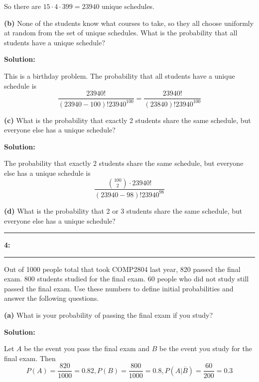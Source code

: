 \documentclass[11pt]{article}
\newcommand\question[2]{\vspace{.25in}\hrule\textbf{#1: #2}\vspace{.5em}\hrule\vspace{.10in}}
\renewcommand\part[1]{\vspace{.10in}\textbf{(#1)}}
\newcommand{\solution}{\vspace{.10in}\textbf{Solution: }}
\begin{document}
So there are $15\cdot 4 \cdot 399 = 23940$ unique schedules.

\part{b} None of the students know what courses to take, so they all choose uniformly at random from the set of unique schedules. What is the probability that all students have a unique schedule?

\solution

This is a birthday problem. The probability that all students have a unique schedule is
\[
\frac{23940!}{(23940-100)! 23940^{100}} = \frac{23940!}{(23840)! 23940^{100}}
\]

\part{c}
What is the probability that exactly 2 students share the same schedule, but everyone else has a unique schedule?

\solution

The probability that exactly 2 students share the same schedule, but everyone else has a unique schedule is
\[
\frac{\binom{100}{2} \cdot 23940!}{(23940-98)! 23940^{98}}
\]

\part{d}
What is the probability that 2 or 3 students share the same schedule, but everyone else has a unique schedule?

\question{4}{}
Out of 1000 people total that took COMP2804 last year, 820 passed the final exam. 800 students studied for the final exam. 60 people who did not study still passed the final exam. Use these numbers to define initial probabilities and answer the following questions.

\part{a} What is your probability of passing the final exam if you study?

\solution

Let $A$ be the event you pass the final exam and $B$ be the event you study for the final exam. Then
\begin{equation*}
  P(A) = \frac{820}{1000} = 0.82, P(B) = \frac{800}{1000} = 0.8, P(A|\overline{B}) = \frac{60}{200} = 0.3
\end{equation*}
\end{document}
